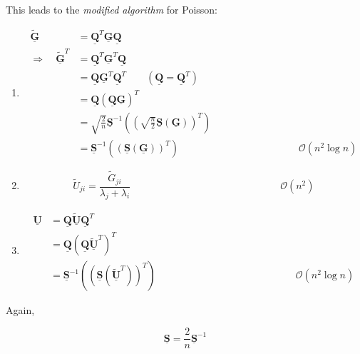This leads to the \emph{modified algorithm} for Poisson:
\renewcommand{\theenumi}{\arabic{enumi}}
\renewcommand{\labelenumi}{\textbf{\theenumi)}}
\begin{enumerate}
  \item
    \begin{align*}
      \underline{\widetilde{\mathbf{G}}} &= \underline{\mathbf{Q}}^T \underline{\mathbf{G}} \underline{\mathbf{Q}} \\
      \Rightarrow \quad \underline{\widetilde{\mathbf{G}}}^T &= \underline{\mathbf{Q}}^T \underline{\mathbf{G}}^T \underline{\mathbf{Q}} \\
      &= \underline{\mathbf{Q}} \underline{\mathbf{G}}^T \underline{\mathbf{Q}}^T \qquad (\underline{\mathbf{Q}}=\underline{\mathbf{Q}}^T) \\
      &= \underline{\mathbf{Q}} (\underline{\mathbf{Q}} \underline{\mathbf{G}})^T \\
      &= \sqrt{\frac{2}{n}} \underline{\mathbf{S}}^{-1} \left( \left( \sqrt{\frac{n}{2}} \underline{\mathbf{S}}( \underline{\mathbf{G}}) \right)^T \right) \\
      &= \underline{\mathbf{S}}^{-1} ((\underline{\mathbf{S}} (\underline{\mathbf{G}}))^T) \qquad \qquad \qquad \qquad \qquad \qquad \mathcal{O}(n^2 \log n)
    \end{align*}

  \item
    \begin{equation*}
      \widetilde{U}_{ji} = \frac{\widetilde{G}_{ji}}{\lambda_j+\lambda_i} \qquad \qquad \qquad \qquad \qquad \qquad \qquad \quad \mathcal{O}(n^2)
    \end{equation*}

  \item
    \begin{align*}
      \underline{\mathbf{U}} &= \underline{\mathbf{Q}} \underline{\mathbf{\widetilde{U}}} \underline{\mathbf{Q}}^T \\
      &= \underline{\mathbf{Q}} ( \underline{\mathbf{Q}} \underline{\mathbf{\widetilde{U}}}^T)^T \\
      &= \underline{\mathbf{S}}^{-1}((\underline{\mathbf{S}}(\underline{\mathbf{\widetilde{U}}}^T))^T) \qquad \qquad \qquad \qquad \qquad \qquad \qquad \mathcal{O}(n^2 \log n)
    \end{align*}
\end{enumerate}

Again,

\begin{equation*}
  \underline{\mathbf{S}} = \frac{2}{n} \underline{\mathbf{S}}^{-1}
\end{equation*}

